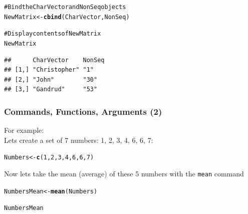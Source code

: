 \documentclass{beamer}\usepackage{graphicx, color}
\makeatletter
\newcommand{\hlfunctioncall}[1]{\textcolor[rgb]{0.501960784313725,0,0.329411764705882}{\textbf{#1}}}%
\newcommand{\hlcomment}[1]{\textcolor[rgb]{0.180392156862745,0.6,0.341176470588235}{#1}}%
\newenvironment{kframe}{%
 \def\at@end@of@kframe{}%
 \ifinner\ifhmode%
  \def\at@end@of@kframe{\end{minipage}}%
  \begin{minipage}{\columnwidth}%
 \fi\fi%
 \def\FrameCommand##1{\hskip\@totalleftmargin \hskip-\fboxsep
 \colorbox{shadecolor}{##1}\hskip-\fboxsep
     \hskip-\linewidth \hskip-\@totalleftmargin \hskip\columnwidth}%
 \MakeFramed {\advance\hsize-\width
   \@totalleftmargin\z@ \linewidth\hsize
   \@setminipage}}%
 {\par\unskip\endMakeFramed%
 \at@end@of@kframe}
\newenvironment{knitrout}{}{} %
\makeatother
\begin{document}
\begin{frame}
\begin{knitrout}
\color{fgcolor}\begin{kframe}
\begin{alltt}
\hlcomment{# Bind the CharVector and NonSeq objects}
NewMatrix <- \hlfunctioncall{cbind}(CharVector, NonSeq)

\hlcomment{# Display contents of NewMatrix}
NewMatrix
\end{alltt}
\begin{verbatim}
##      CharVector    NonSeq
## [1,] "Christopher" "1"   
## [2,] "John"        "30"  
## [3,] "Gandrud"     "53"
\end{verbatim}
\end{kframe}
\end{knitrout}

\end{frame}



\begin{frame}[fragile]
  \frametitle{Commands, Functions, Arguments (2)}
  {\LARGE{For example:}} \\[0.5cm]
  Lets create a set of 7 numbers: 1, 2, 3, 4, 6, 6, 7:

\begin{kframe}
\begin{alltt}
Numbers <- \hlfunctioncall{c}(1, 2, 3, 4, 6, 6, 7)
\end{alltt}
\end{kframe}


Now lets take the mean (average) of these 5 numbers with the {\tt{mean}} command

\begin{kframe}
\begin{alltt}
NumbersMean <- \hlfunctioncall{mean}(Numbers)

NumbersMean
\end{alltt}
\end{kframe}
[1] 4.143



\end{frame}
\end{document}
